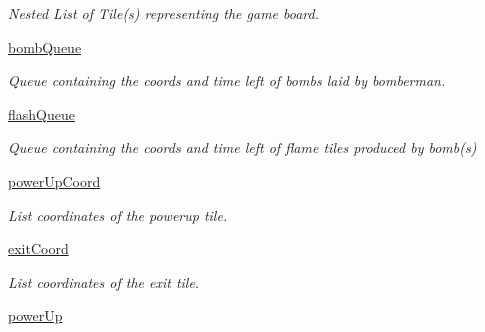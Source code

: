 \begin{DoxyCompactItemize}
\begin{DoxyCompactList}\small\item\em Nested List of Tile(s) representing the game board. \end{DoxyCompactList}\item 
\hypertarget{classsrc_1_1level_1_1_level_ad6cc50ff3008c2fd8497b22070d7da64}{}\hyperlink{classsrc_1_1level_1_1_level_ad6cc50ff3008c2fd8497b22070d7da64}{bomb\+Queue}\label{classsrc_1_1level_1_1_level_ad6cc50ff3008c2fd8497b22070d7da64}

\begin{DoxyCompactList}\small\item\em Queue containing the coords and time left of bombs laid by bomberman. \end{DoxyCompactList}\item 
\hypertarget{classsrc_1_1level_1_1_level_ac6d2065a5cd3ddd4348bb7f6394a0b46}{}\hyperlink{classsrc_1_1level_1_1_level_ac6d2065a5cd3ddd4348bb7f6394a0b46}{flash\+Queue}\label{classsrc_1_1level_1_1_level_ac6d2065a5cd3ddd4348bb7f6394a0b46}

\begin{DoxyCompactList}\small\item\em Queue containing the coords and time left of flame tiles produced by bomb(s) \end{DoxyCompactList}\item 
\hypertarget{classsrc_1_1level_1_1_level_a5445bee2b7b93a1caa1a0a5bf3455db9}{}\hyperlink{classsrc_1_1level_1_1_level_a5445bee2b7b93a1caa1a0a5bf3455db9}{power\+Up\+Coord}\label{classsrc_1_1level_1_1_level_a5445bee2b7b93a1caa1a0a5bf3455db9}

\begin{DoxyCompactList}\small\item\em List coordinates of the powerup tile. \end{DoxyCompactList}\item 
\hypertarget{classsrc_1_1level_1_1_level_ab0595b7e689e25d540f0f486413e0514}{}\hyperlink{classsrc_1_1level_1_1_level_ab0595b7e689e25d540f0f486413e0514}{exit\+Coord}\label{classsrc_1_1level_1_1_level_ab0595b7e689e25d540f0f486413e0514}

\begin{DoxyCompactList}\small\item\em List coordinates of the exit tile. \end{DoxyCompactList}\item 
\hypertarget{classsrc_1_1level_1_1_level_a50126ed45ccd7be41b5b80a4bf821028}{}\hyperlink{classsrc_1_1level_1_1_level_a50126ed45ccd7be41b5b80a4bf821028}{power\+Up}\label{classsrc_1_1level_1_1_level_a50126ed45ccd7be41b5b80a4bf821028}


\end{DoxyCompactItemize}
